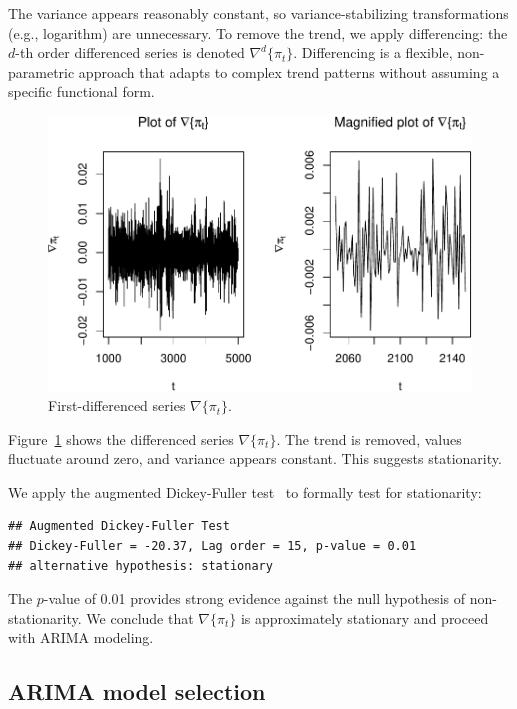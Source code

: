 \documentclass[final,11pt]{article}
\theoremstyle{plain}
\theoremstyle{remark}
\begin{document}
The variance appears reasonably constant, so variance-stabilizing
transformations (e.g., logarithm) are unnecessary. To remove the trend,
we apply differencing: the $d$-th order differenced series is denoted
$\nabla^d\{\pi_t\}$. Differencing is a flexible, non-parametric approach
that adapts to complex trend patterns without assuming a specific
functional form.

\begin{figure}
\includegraphics{paper_files/figure-latex/unnamed-chunk-4-1.pdf}
\caption{First-differenced series $\nabla \{\pi_t\}$.}
\label{fig:f1}
\end{figure}

Figure~\ref{fig:f1} shows the differenced series $\nabla\{\pi_t\}$. The
trend is removed, values fluctuate around zero, and variance appears
constant. This suggests stationarity.

We apply the augmented Dickey-Fuller test~\cite{noauthor_dickeyfuller_2021}
to formally test for stationarity:

\begin{verbatim}
## Augmented Dickey-Fuller Test
## Dickey-Fuller = -20.37, Lag order = 15, p-value = 0.01
## alternative hypothesis: stationary
\end{verbatim}

The $p$-value of 0.01 provides strong evidence against the null hypothesis
of non-stationarity. We conclude that $\nabla\{\pi_t\}$ is approximately
stationary and proceed with ARIMA modeling.

\hypertarget{arima-model-selection}{%
\subsection{ARIMA model selection}\label{arima-model-selection}}
\end{document}
